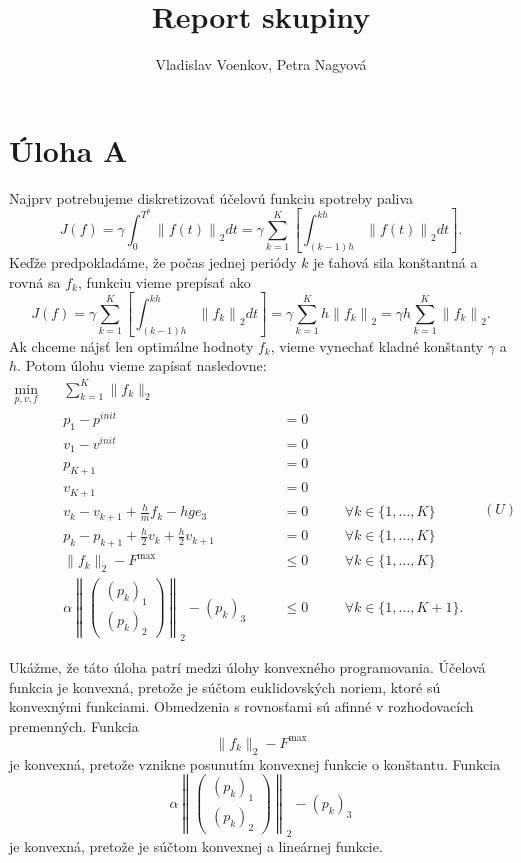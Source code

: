 \documentclass[12pt,a4paper]{article}
\title{Report skupiny
  \emoji{folded-hands}
  \emoji{folded-hands}
  \emoji{folded-hands}
}
\author{Vladislav Voenkov, Petra Nagyová}
\date{}
\begin{document}
\maketitle


\section*{Úloha A}

Najprv potrebujeme diskretizovať účelovú funkciu spotreby paliva
\[
J(f) = \gamma \int_{0}^{T^p} \left\|f(t)\right\|_{2} dt =
\gamma \sum_{k=1}^K \left[ \int_{(k-1)h}^{kh} \left\|f(t)\right\|_{2} dt \right].
\]
Keďže predpokladáme, že počas jednej periódy \(k\) je ťahová sila konštantná
a rovná sa \(f_k\), funkciu vieme prepísať ako
\[
J(f) = \gamma \sum_{k=1}^K \left[ \int_{(k-1)h}^{kh} \left\|f_k\right\|_{2} dt \right] =
\gamma \sum_{k=1}^K h \left\|f_k\right\|_{2} =
\gamma h \sum_{k=1}^K \left\|f_k\right\|_{2}.
\]
Ak chceme nájsť len optimálne hodnoty \(f_k\), vieme vynechať kladné konštanty
\(\gamma\) a \(h\). Potom úlohu vieme zapísať nasledovne:
\[
\begin{alignedat}{3}
  \min_{p,v,f} \quad
  & \sum_{k=1}^{K} \|f_k\|_2 \\
  & p_1 - p^{init} &\quad&= 0 \\
  & v_1 - v^{init} &\quad&= 0 \\
  & p_{K+1}       &\quad&= 0 \\
  & v_{K+1}       &\quad&= 0 \\
  & v_k - v_{k+1} + \frac{h}{m} f_k - h g e_3 &\quad&= 0
  &\quad&\forall k \in \{1,\dots,K\} \\
  & p_k - p_{k+1} + \frac{h}{2} v_k + \frac{h}{2} v_{k+1} &\quad&= 0
  &\quad&\forall k \in \{1,\dots,K\}\\
  & \|f_k\|_2 - F^{\max} &\quad&\le 0 &\quad&\forall k \in \{1,\dots,K\} \\
  & \alpha \left\|
    \begin{pmatrix}
      (p_k)_1 \\
      (p_k)_2
    \end{pmatrix}
    \right\|_2 - (p_k)_3
    &\quad&\le 0
    &\quad&\forall k \in \{1,\dots,K+1\}.
\end{alignedat} \quad (U)
\]

\begin{samepage}
  Ukážme, že táto úloha patrí medzi úlohy konvexného programovania.
  Účelová funkcia je konvexná, pretože je súčtom euklidovských noriem, ktoré sú
  konvexnými funkciami. Obmedzenia s rovnosťami sú afinné v rozhodovacích
  premenných. Funkcia
  \[
  \|f_k\|_2 - F^{\max}
  \]
  je konvexná, pretože vznikne posunutím konvexnej funkcie o konštantu. Funkcia
  \[
  \alpha \left\|
  \begin{pmatrix}
    (p_k)_1 \\
    (p_k)_2
  \end{pmatrix}
  \right\|_2 - (p_k)_3
  \]
  je konvexná, pretože je súčtom konvexnej a lineárnej funkcie.
\end{samepage}
\end{document}
